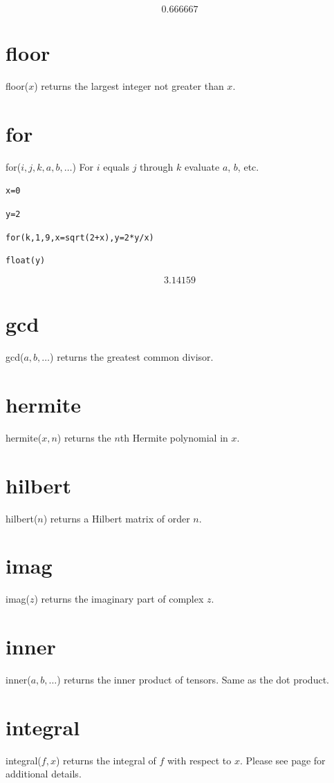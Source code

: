 \documentclass[12pt,openany]{report}
\begin{document}
$$0.666667$$

\section*{floor}
floor($x$) returns the largest integer not greater than $x$.

\section*{for}
for($i,j,k,a,b,\ldots$) For $i$ equals $j$ through $k$ evaluate $a$, $b$, etc.

\medskip
{\tt x=0}

{\tt y=2}

{\tt for(k,1,9,x=sqrt(2+x),y=2*y/x)}

{\tt float(y)}

$$3.14159$$

\section*{gcd}
gcd($a,b,\ldots$) returns the greatest common divisor.

\section*{hermite}
hermite($x,n$) returns the $n$th Hermite polynomial in $x$.

\section*{hilbert}
hilbert($n$) returns a Hilbert matrix of order $n$.

\section*{imag}
imag($z$) returns the imaginary part of complex $z$.

\section*{inner}
inner($a,b,\ldots$) returns the inner product of tensors.
Same as the dot product.

\section*{integral}
integral($f,x$) returns the integral of $f$ with respect to $x$.
Please see page \pageref{integral} for additional details.
\end{document}
